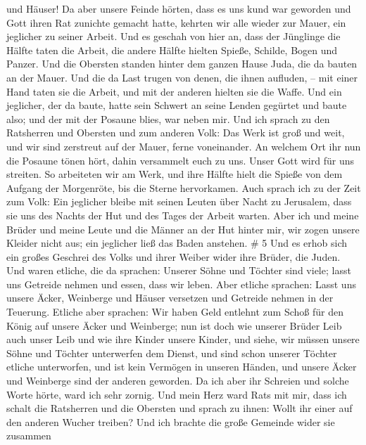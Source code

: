 und Häuser!  Da aber unsere Feinde hörten, dass es uns kund
war geworden und Gott ihren Rat zunichte gemacht hatte, kehrten wir alle
wieder zur Mauer, ein jeglicher zu seiner Arbeit.  Und es
geschah von hier an, dass der Jünglinge die Hälfte taten die Arbeit, die
andere Hälfte hielten Spieße, Schilde, Bogen und Panzer. Und die
Obersten standen hinter dem ganzen Hause Juda,  die da
bauten an der Mauer. Und die da Last trugen von denen, die ihnen
aufluden, -- mit einer Hand taten sie die Arbeit, und mit der anderen
hielten sie die Waffe.  Und ein jeglicher, der da baute,
hatte sein Schwert an seine Lenden gegürtet und baute also; und der mit
der Posaune blies, war neben mir.  Und ich sprach zu den
Ratsherren und Obersten und zum anderen Volk: Das Werk ist groß und
weit, und wir sind zerstreut auf der Mauer, ferne voneinander.
 An welchem Ort ihr nun die Posaune tönen hört, dahin
versammelt euch zu uns. Unser Gott wird für uns streiten. 
So arbeiteten wir am Werk, und ihre Hälfte hielt die Spieße von dem
Aufgang der Morgenröte, bis die Sterne hervorkamen.  Auch
sprach ich zu der Zeit zum Volk: Ein jeglicher bleibe mit seinen Leuten
über Nacht zu Jerusalem, dass sie uns des Nachts der Hut und des Tages
der Arbeit warten.  Aber ich und meine Brüder und meine
Leute und die Männer an der Hut hinter mir, wir zogen unsere Kleider
nicht aus; ein jeglicher ließ das Baden anstehen. \# 5  Und
es erhob sich ein großes Geschrei des Volks und ihrer Weiber wider ihre
Brüder, die Juden.  Und waren etliche, die da sprachen:
Unserer Söhne und Töchter sind viele; lasst uns Getreide nehmen und
essen, dass wir leben.  Aber etliche sprachen: Lasst uns
unsere Äcker, Weinberge und Häuser versetzen und Getreide nehmen in der
Teuerung.  Etliche aber sprachen: Wir haben Geld entlehnt
zum Schoß für den König auf unsere Äcker und Weinberge;  nun
ist doch wie unserer Brüder Leib auch unser Leib und wie ihre Kinder
unsere Kinder, und siehe, wir müssen unsere Söhne und Töchter
unterwerfen dem Dienst, und sind schon unserer Töchter etliche
unterworfen, und ist kein Vermögen in unseren Händen, und unsere Äcker
und Weinberge sind der anderen geworden.  Da ich aber ihr
Schreien und solche Worte hörte, ward ich sehr zornig.  Und
mein Herz ward Rats mit mir, dass ich schalt die Ratsherren und die
Obersten und sprach zu ihnen: Wollt ihr einer auf den anderen Wucher
treiben? Und ich brachte die große Gemeinde wider sie zusammen
